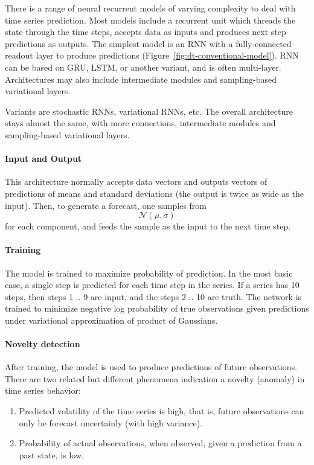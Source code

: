 \documentclass[runningheads]{llncs}
\begin{document}
There is a range of neural recurrent models of varying complexity to deal with
time series prediction. Most models include a recurrent unit which threads the
state through the time steps, accepts data as inputs and produces next step
predictions as outputs. The simplest model is an RNN with a fully-connected
readout layer to produce predictions (Figure~\ref{fig:dt-conventional-model}).
RNN can be based on GRU, LSTM, or another variant, and is often multi-layer.
Architectures  may also include intermediate modules and sampling-based
variational layers.

Variants are stochastic RNNs, variational RNNs, etc. The
overall architecture stays almost the same, with more
connections, intermediate modules and sampling-based variational
layers.

\paragraph{Input and Output} This architecture normally accepts data vectors
and outputs vectors of predictions of means and standard deviations (the output
is twice as wide as the input). Then, to generate a forecast, one samples from
$$\mathcal{N}(\mu, \sigma)$$ for each component, and feeds the sample as the
input to the next time step.

\paragraph{Training} The model is trained to maximize probability of
prediction. In the most basic case, a single step is predicted for each time
step in the series. If a series has 10 steps, then steps 1 .. 9 are input, and
the steps 2 .. 10 are truth. The network is trained to
minimize negative log probability of true observations given
predictions under variational approximation of product of
Gaussians. 

\paragraph{Novelty detection} After training, the model is used to produce
predictions of future observations. There are two related but different
phenomena indication a novelty (anomaly) in time series behavior:
\begin{enumerate}
	\item Predicted volatility of the time series is high, that is, future
	observations can only be forecast uncertainly (with high variance). 
	\item Probability of actual observations, when observed, given a prediction
	from a past state, is low.
\end{enumerate}
\end{document}
